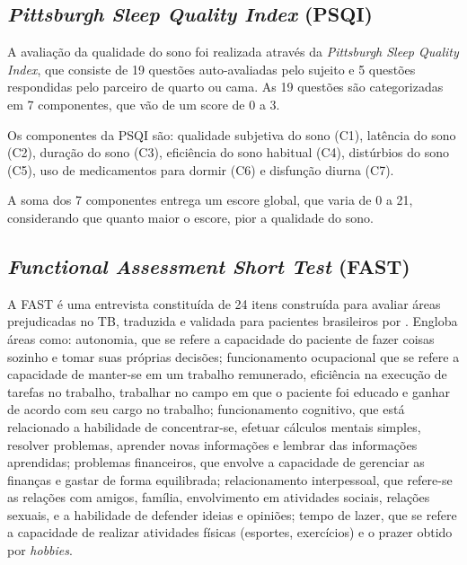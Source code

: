 \documentclass[chapter=TITLE,
               oneside,
               12pt,
               a4paper,
               english,
               brazil]{abntex2}    %
\begin{document}
        \subsection{\textit{Pittsburgh Sleep Quality Index} (PSQI)}
        \label{sec:psqi}
    
            A avaliação da qualidade do sono foi realizada através da
            \textit{Pittsburgh Sleep Quality Index}, que consiste de 19 questões
            auto-avaliadas pelo sujeito e 5 questões respondidas pelo parceiro de
            quarto ou cama. 
            As 19 questões são categorizadas em 7 componentes, que vão de um score
            de 0 a 3.
            \parencite{bertolazi_validation_2011}
    
            Os componentes da PSQI são: qualidade subjetiva do sono (C1),
            latência do sono (C2), duração do sono (C3),
            eficiência do sono habitual (C4), distúrbios do sono (C5),
            uso de medicamentos para dormir (C6) e disfunção diurna (C7).
    
            A soma dos 7 componentes entrega um escore global, que varia de 0 a 21,
            considerando que quanto maior o escore, pior a qualidade do sono.
    
        \subsection{\textit{Functional Assessment Short Test} (FAST)}
        \label{sec:fast}
    
            A FAST é uma entrevista constituída de 24 itens construída para avaliar
            áreas prejudicadas no TB, traduzida e validada para pacientes brasileiros
            por \textcite{cacilhas_validity_2009}.
            Engloba áreas como: autonomia, que se refere a capacidade do paciente de
            fazer coisas sozinho e tomar suas próprias decisões; funcionamento
            ocupacional que se refere a capacidade de manter-se em um trabalho
            remunerado, eficiência na execução de tarefas no trabalho, trabalhar
            no campo em que o paciente foi educado e ganhar de acordo com seu cargo
            no trabalho; funcionamento cognitivo, que está relacionado a habilidade
            de concentrar-se, efetuar cálculos mentais simples, resolver problemas,
            aprender novas informações e lembrar das informações aprendidas; problemas
            financeiros, que envolve a capacidade de gerenciar as finanças e gastar de
            forma equilibrada; relacionamento interpessoal, que refere-se as relações
            com amigos, família, envolvimento em atividades sociais, relações sexuais,
            e a habilidade de defender ideias e opiniões; tempo de lazer, que se refere
            a capacidade de realizar atividades físicas (esportes, exercícios) e o prazer
            obtido por \textit{hobbies}.
    
\end{document}
